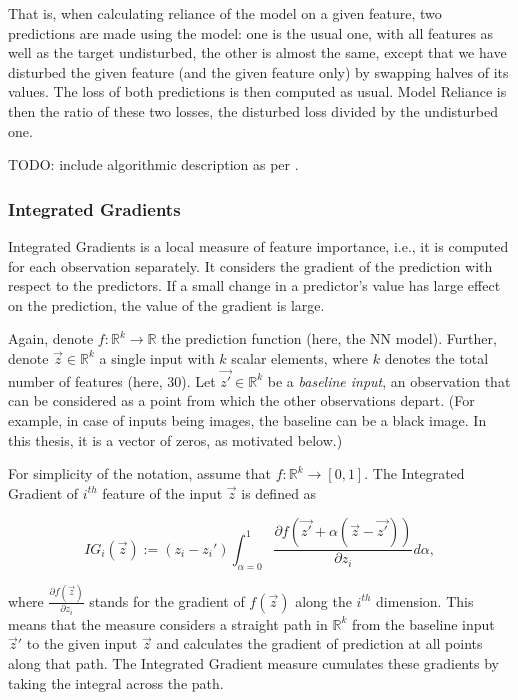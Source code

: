 		That is, when calculating reliance of the model on a given feature, two predictions are made using the model: one is the usual one, with all features as well as the target undisturbed, the other is almost the same, except that we have disturbed the given feature (and the given feature only) by swapping halves of its values. The loss of both predictions is then computed as usual. Model Reliance is then the ratio of these two losses, the disturbed loss divided by the undisturbed one.   
		
		TODO: include algorithmic description as per \cite{molnar2020interpretable}.
	
		
	\subsubsection{Integrated Gradients}
		Integrated Gradients \citep{sundararajan2017axiomatic} is a local measure of feature importance, i.e., it is computed for each observation separately. It considers the gradient of the prediction with respect to the predictors. If a small change in a predictor's value has large effect on the prediction, the value of the gradient is large.
		
		Again, denote $f: \mathbb{R}^k \rightarrow \mathbb{R}$ the prediction function (here, the NN model). Further, denote $\vec{z} \in  \mathbb{R}^k$ a single input with $k$ scalar elements, where $k$ denotes the total number of features (here, 30). Let $\vec{z'} \in  \mathbb{R}^k$ be a \textit{baseline input}, an observation that can be considered as a point from which the other observations depart. (For example, in case of inputs being images, the baseline can be a black image. In this thesis, it is a vector of zeros, as motivated below.) 
		
		For simplicity of the notation, assume that $f: \mathbb{R}^k \rightarrow [0,1]$. The Integrated Gradient of $i^{th}$ feature of the input $\vec{z}$ is defined as 
		
		\begin{equation}
			IG_i(\vec{z}) := (z_i - z_i') \int_{\alpha=0}^{1} \frac{\partial f(\vec{z'} + \alpha(\vec{z}-\vec{z'}))}{\partial z_i}d\alpha,
		\end{equation}
		
		where $\frac{\partial f(\vec{z})}{\partial z_i}$ stands for the gradient of $f(\vec{z})$ along the $i^{th}$ dimension. This means that the measure considers a straight path in $\mathbb{R}^k$ from the baseline input ${\vec{z}'}$ to the given input ${\vec{z}}$ and calculates the gradient of prediction at all points along that path. The Integrated Gradient measure cumulates these gradients by taking the integral across the path.  
		
